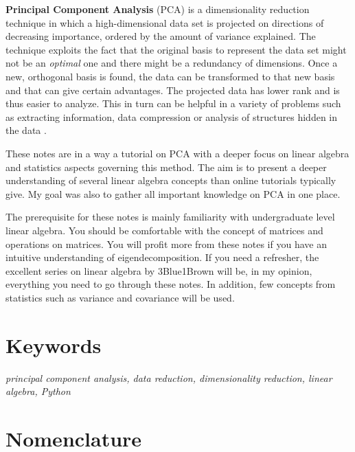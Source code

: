 \documentclass[10pt,twocolumn]{article}
\begin{document}
\setlength{\parindent}{0em}
\setlength{\parskip}{1em}

\textbf{Principal Component Analysis} (PCA) is a dimensionality reduction technique in which a high-dimensional data set is projected on directions of decreasing importance, ordered by the amount of variance explained. The technique exploits the fact that the original basis to represent the data set might not be an \textit{optimal} one and there might be a redundancy of dimensions. Once a new, orthogonal basis is found, the data can be transformed to that new basis and that can give certain advantages. The projected data has lower rank and is thus easier to analyze. This in turn can be helpful in a variety of problems such as extracting information, data compression or analysis of structures hidden in the data \cite{Abdi_Williams}.

These notes are in a way a tutorial on PCA with a deeper focus on linear algebra and statistics aspects governing this method. The aim is to present a deeper understanding of several linear algebra concepts than online tutorials typically give. My goal was also to gather all important knowledge on PCA in one place. 

The prerequisite for these notes is mainly familiarity with undergraduate level linear algebra. You should be comfortable with the concept of matrices and operations on matrices. You will profit more from these notes if you have an intuitive understanding of eigendecomposition. If you need a refresher, the excellent series on linear algebra by 3Blue1Brown \cite{3Blue1Brown} will be, in my opinion, everything you need to go through these notes. In addition, few concepts from statistics such as variance and covariance will be used.

\section*{Keywords}

\textit{principal component analysis, data reduction, dimensionality reduction, linear algebra, Python}

\newpage

\tableofcontents

\section*{Nomenclature}
\end{document}
